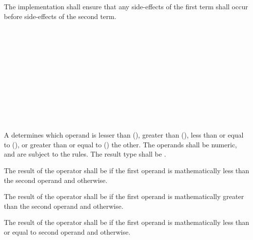 \specsubsubitem
The implementation shall ensure that any side-effects of the first term shall
occur before side-effects of the second term.


\begin{grammar}
 \\
	 \\
	 \terminal{<}  \\
	 \terminal{>}  \\
	 \terminal{<=}  \\
	 \terminal{>=}  \\

 \\
	 \\
	 \terminal{==}  \\
	 \terminal{!=}  \\
\end{grammar}

\specsubsubitem
A  determines which operand is lesser than
(\terminal{<}), greater than (\terminal{>}), less than or equal to
(\terminal{<=}), or greater than or equal to (\terminal{>=}) the other. The
operands shall be numeric, and are subject to the 
rules.  The result type shall be .

\specsubsubitem
The result of the \terminal{<} operator shall be  if the first
operand is mathematically less than the second operand and 
otherwise.

\specsubsubitem
The result of the \terminal{>} operator shall be  if the first
operand is mathematically greater than the second operand and 
otherwise.

\specsubsubitem
The result of the \terminal{<=} operator shall be  if the
first operand is mathematically less than or equal to second operand
and  otherwise.

